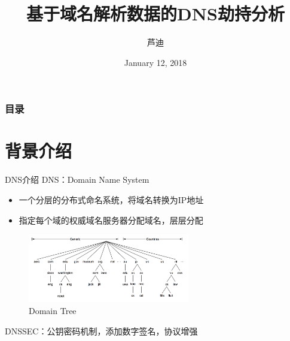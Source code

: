 \documentclass{beamer}
\title[毕设开题] %
{基于域名解析数据的DNS劫持分析}
\author[芦迪] %
{芦迪 }
\institute[THU, EE] %
{
  指导老师：李星 \\
  \
  
  Department of Electronic Engineering,\\
  Tsinghua University
  
}
\date[2018.1.12] %
{January 12, 2018}
\begin{document}
\frame{\titlepage}


\begin{frame}
\frametitle{目录}
\tableofcontents
\end{frame}


\section{背景介绍}

\begin{frame}{DNS介绍}
  DNS：Domain Name System
  \begin{itemize}
    \item 一个分层的分布式命名系统，将域名转换为IP地址
    \item 指定每个域的权威域名服务器分配域名，层层分配
  \end{itemize}
  \begin{figure}
  \includegraphics[height=3cm,width=7.07cm]{images/domain_tree.png}
  \caption{Domain Tree}
  \end{figure}
  DNSSEC：公钥密码机制，添加数字签名，协议增强

\end{frame}
\end{document}
